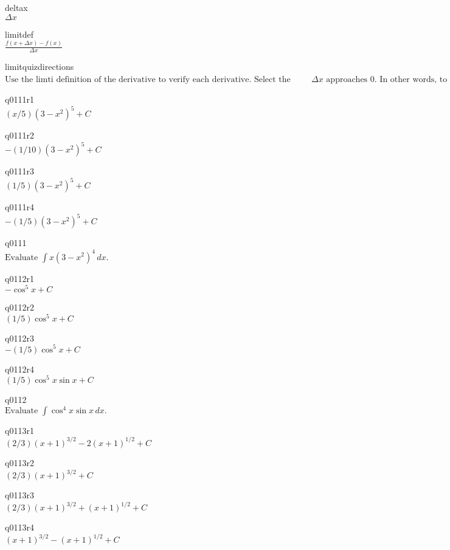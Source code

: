 deltax\\
\(\displaystyle \Delta x \)

limitdef\\
\(\displaystyle \frac{f(x + \Delta x) - f(x)}{\Delta x} \)

limitquizdirections\\
\(\displaystyle \text{Use the limti definition of the derivative to verify each derivative. Select the simplified algebraic expression that occurs before you take the li} \Delta x \text{ approaches } 0. \text{ In other words, to what does } \frac{f(x + \Delta x) - f(x)}{\Delta x} \text{ simplify, before you take the limit?} \)

q0111r1\\
\(\displaystyle (x/5)(3-x^2)^5 + C \)

q0111r2\\
\(\displaystyle -(1/10)(3-x^2)^5 + C \)

q0111r3\\
\(\displaystyle (1/5)(3-x^2)^5 + C \)

q0111r4\\
\(\displaystyle -(1/5)(3-x^2)^5 + C \)

q0111\\
\(\displaystyle \text{Evaluate } \int x(3-x^2)^4 \, dx. \)

q0112r1\\
\(\displaystyle -\cos^5 x + C \)

q0112r2\\
\(\displaystyle (1/5) \cos^5 x + C \)

q0112r3\\
\(\displaystyle -(1/5) \cos^5 x + C \)

q0112r4\\
\(\displaystyle (1/5) \cos^5 x \sin x + C \)

q0112\\
\(\displaystyle \text{Evaluate } \int \cos^4 x \sin x \, dx. \)

q0113r1\\
\(\displaystyle (2/3)(x+1)^{3/2} - 2(x+1)^{1/2} + C \)

q0113r2\\
\(\displaystyle (2/3)(x+1)^{3/2} + C \)

q0113r3\\
\(\displaystyle (2/3)(x+1)^{3/2} + (x+1)^{1/2} + C \)

q0113r4\\
\(\displaystyle (x+1)^{3/2} - (x+1)^{1/2} + C \)

